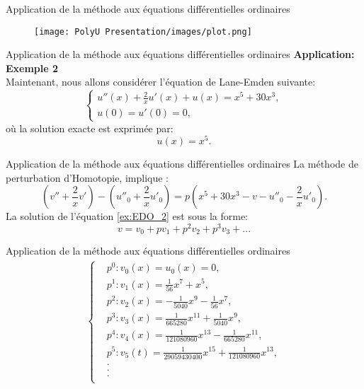 \documentclass{sintefbeamer}
\begin{document}
\begin{frame}{Application de la méthode aux équations différentielles ordinaires}
    \begin{figure}[H]
    \centering
    \texttt{[image: PolyU Presentation/images/plot.png]}
\end{figure}
\end{frame}


\begin{frame}{Application de la méthode aux équations différentielles ordinaires}
    \textbf{Application: Exemple 2} \\
    Maintenant, nous allons considérer l'équation de Lane-Emden suivante:
\begin{equation}\label{ex:EDO_2}
    \begin{cases}
        u''(x)+\frac{2}{x}u'(x)+u(x) = x^5 + 30x^3,\\
        u(0) = u'(0)=0,
    \end{cases}
\end{equation}
où la solution exacte est exprimée par:
\begin{equation}
    u(x)=x^5.
\end{equation}
\end{frame}


\begin{frame}{Application de la méthode aux équations différentielles ordinaires}
     La méthode de perturbation d'Homotopie, implique :
\begin{equation} \label{sol:EDO_2}
    \left(v''+\frac{2}{x}v'\right) - \left(u''_0+\frac{2}{x}u'_0 \right) = p\left(x^5+30x^3-v-u''_0 - \frac{2}{x}u'_0\right).
\end{equation}
La solution de l'équation \ref{ex:EDO_2} est sous la forme:
\begin{equation}
    v=v_0+pv_1+p^2v_2+p^3v_3 + ...
\end{equation}
\end{frame}


\begin{frame}{Application de la méthode aux équations différentielles ordinaires}
\begin{align*}
    \begin{cases}
        &p^0 : v_0(x) = u_0(x)=0,\\
        &p^1 : v_1(x)=\frac{1}{56}x^7 + x^5,\\
        &p^2 : v_2(x) = -\frac{1}{5040}x^9 - \frac{1}{56}x^7,\\
        &p^3 : v_3(x) = \frac{1}{665280}x^{11}+\frac{1}{5040}x^9,\\
        &p^4 : v_4(x) = \frac{1}{121080960} x^{13} - \frac{1}{665280}x^{11},\\
        &p^5 : v_5(t) = \frac{1}{29059430400}x^{15} + \frac{1}{121080960} x^{13},\\
        &    .\\
        &    .\\
        &    .\\
    \end{cases}
\end{align*}
\end{frame}
\end{document}
